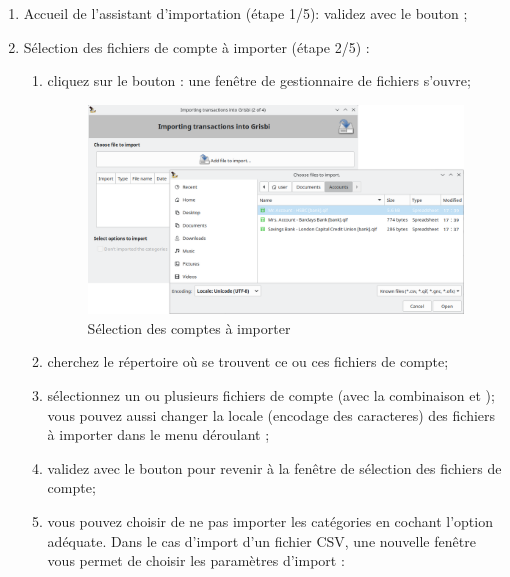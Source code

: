 \begin{enumerate}
	\item Accueil de l'assistant d'importation (étape 1/5): validez avec le bouton ;
	\item Sélection des fichiers de compte à importer (étape 2/5) :	
		\begin{enumerate}
			\item cliquez sur le bouton : une fenêtre de gestionnaire de fichiers s'ouvre;
			\begin{figure}[htbp]
				\raggedleft
					\includegraphics[width=.95\textwidth]{image/screenshot/importexport_import_files_select}
				\caption{Sélection des comptes à importer}
				\label{importexport-import-files-select-img}
			\end{figure}
			\item cherchez le répertoire où se trouvent ce ou ces fichiers de compte;
			\item sélectionnez un ou plusieurs fichiers de compte (avec la combinaison  et ); vous pouvez aussi changer la \gls{locale} (\gls{encodage des caracteres}) des fichiers à importer dans le menu déroulant ;
			\item validez avec le bouton  pour revenir à la fenêtre de sélection des fichiers de compte;
			\item vous pouvez choisir de ne pas importer les catégories en cochant l'option adéquate. Dans le cas d'import d'un fichier \gls{CSV}, une nouvelle fenêtre vous permet de choisir les paramètres d'import :
				\begin{itemize}[label=\textopenbullet]

\end{itemize}
\end{enumerate}
\end{enumerate}
